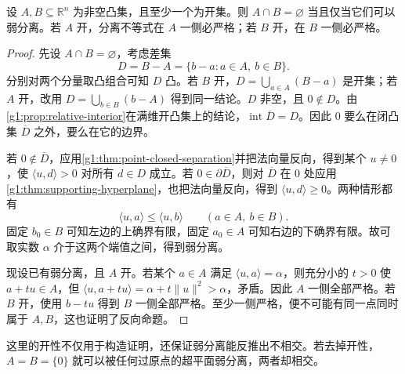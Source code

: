 \begin{theorem}\label{g1:thm:convex-weak-separation}
	设 \(A,B\subseteq\mathbb R^n\) 为非空凸集，且至少一个为开集。则 \(A\cap B=\varnothing\) 当且仅当它们可以弱分离。若 \(A\) 开，分离不等式在 \(A\) 一侧必严格；若 \(B\) 开，在 \(B\) 一侧必严格。
\end{theorem}
\begin{proof}
	先设 \(A\cap B=\varnothing\)，考虑差集
	\[
		D=B-A=\{b-a:a\in A,\ b\in B\}.
	\]
	分别对两个分量取凸组合可知 \(D\) 凸。若 \(B\) 开，\(D=\bigcup_{a\in A}(B-a)\) 是开集；若 \(A\) 开，改用 \(D=\bigcup_{b\in B}(b-A)\) 得到同一结论。\(D\) 非空，且 \(0\notin D\)。由\cref{g1:prop:relative-interior}在满维开凸集上的结论，\(\operatorname{int}\overline D=D\)。因此 \(0\) 要么在闭凸集 \(\overline D\) 之外，要么在它的边界。

	若 \(0\notin\overline D\)，应用\cref{g1:thm:point-closed-separation}并把法向量反向，得到某个 \(u\ne0\)，使 \(\langle u,d\rangle>0\) 对所有 \(d\in D\) 成立。若 \(0\in\partial\overline D\)，则对 \(\overline D\) 在 \(0\) 处应用\cref{g1:thm:supporting-hyperplane}，也把法向量反向，得到 \(\langle u,d\rangle\geq0\)。两种情形都有
	\[
		\langle u,a\rangle\leq\langle u,b\rangle\qquad(a\in A,\ b\in B).
	\]
	固定 \(b_0\in B\) 可知左边的上确界有限，固定 \(a_0\in A\) 可知右边的下确界有限。故可取实数 \(\alpha\) 介于这两个端值之间，得到弱分离。

	现设已有弱分离，且 \(A\) 开。若某个 \(a\in A\) 满足 \(\langle u,a\rangle=\alpha\)，则充分小的 \(t>0\) 使 \(a+tu\in A\)，但 \(\langle u,a+tu\rangle=\alpha+t\lVert u\rVert^2>\alpha\)，矛盾。因此 \(A\) 一侧全部严格。若 \(B\) 开，使用 \(b-tu\) 得到 \(B\) 一侧全部严格。至少一侧严格，便不可能有同一点同时属于 \(A,B\)，这也证明了反向命题。
\end{proof}

这里的开性不仅用于构造证明，还保证弱分离能反推出不相交。若去掉开性，\(A=B=\{0\}\) 就可以被任何过原点的超平面弱分离，两者却相交。

